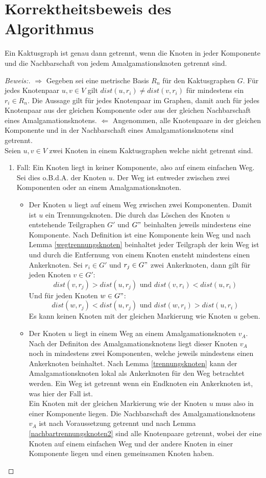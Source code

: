 \section{Korrektheitsbeweis des Algorithmus}
\begin{lem}
Ein Kaktusgraph ist genau dann getrennt, wenn die Knoten in jeder Komponente und die Nachbarschaft von jedem Amalgamationsknoten getrennt sind.  
\end{lem}
\begin{proof}[Beweis:]
$\Longrightarrow$ Gegeben sei eine metrische Basis $R_n$ für den Kaktusgraphen $G$. Für jedes Knotenpaar $u,v \in V$ gilt $dist(u,r_i)\neq dist(v,r_i)$ für mindestens ein $r_i \in R_n$. Die Aussage gilt für jedes Knotenpaar im Graphen, damit auch für jedes Knotenpaar aus der gleichen Komponente oder aus der gleichen Nachbarschaft eines Amalgamationsknotens.\newline
$\Longleftarrow$ Angenommen, alle Knotenpaare in der gleichen Komponente und in der Nachbarschaft eines Amalgamationsknotens sind getrennt.\\
Seien $u,v \in V$ zwei Knoten in einem Kaktusgraphen welche nicht getrennt sind.
\begin{enumerate}
\item Fall: Ein Knoten liegt in keiner Komponente, also auf einem einfachen Weg. Sei dies o.B.d.A. der Knoten $u$. Der Weg ist entweder zwischen zwei Komponenten oder an einem Amalgamationsknoten.
\begin{itemize}
\item Der Knoten $u$ liegt auf einem Weg zwischen zwei Komponenten. Damit ist $u$ ein Trennungsknoten. Die durch das Löschen des Knoten $u$ entstehende Teilgraphen $G'$ und $G"$ beinhalten jeweils mindestens eine Komponente. Nach Definition ist eine Komponente kein Weg und nach Lemma \ref{wegtrennungsknoten} beinhaltet jeder Teilgraph der kein Weg ist und durch die Entfernung von einem Knoten ensteht mindestens einen Ankerknoten. Sei $r_i \in G'$ und $r_j \in G"$ zwei Ankerknoten, dann gilt für jeden Knoten $v \in G'$:
$$ dist(v,r_j)>dist(u,r_j)\text{ und } dist(v,r_i)<dist(u,r_i)$$
Und für jeden Knoten $w \in G"$:
$$ dist(w,r_j)<dist(u,r_j)\text{ und } dist(w,r_i)>dist(u,r_i)$$
Es kann keinen Knoten mit der gleichen Markierung wie Knoten $u$ geben.
\item Der Knoten $u$ liegt in einem Weg an einem Amalgamationsknoten $v_A$. Nach der Definiton des Amalgamationsknotens liegt dieser Knoten $v_A$ noch in mindestens zwei Komponenten, welche jeweils mindestens einen Ankerknoten beinhaltet. Nach Lemma \ref{trennungsknoten} kann der Amalgamationsknoten lokal als Ankerknoten für den Weg betrachtet werden. Ein Weg ist getrennt wenn ein Endknoten ein Ankerknoten ist, was hier der Fall ist.\\Ein Knoten mit der gleichen Markierung wie der Knoten $u$ muss also in einer Komponente liegen. Die Nachbarschaft des Amalgamationsknotens $v_A$ ist nach Voraussetzung getrennt und nach Lemma \ref{nachbartrennungsknoten2} sind alle Knotenpaare getrennt, wobei der eine Knoten auf einem einfachen Weg und der andere Knoten in einer Komponente liegen und einen gemeinsamen Knoten haben.  

\end{itemize}
\end{enumerate}
\end{proof}
